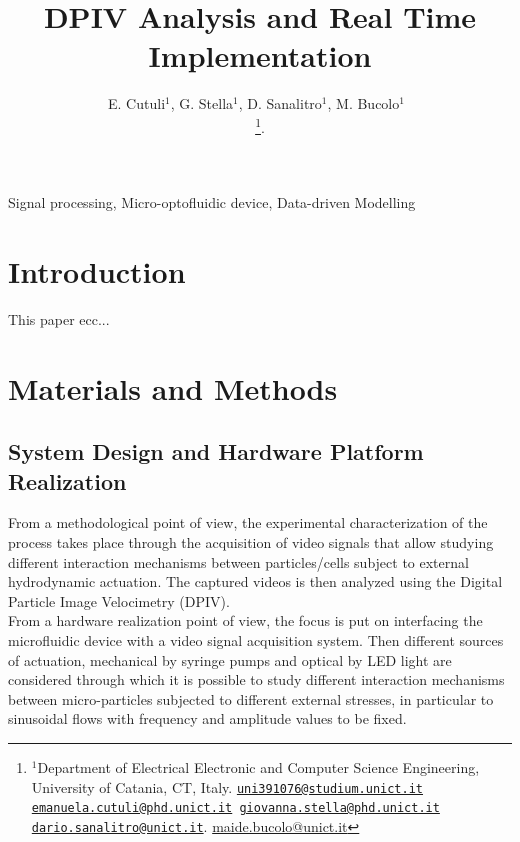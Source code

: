 \documentclass[journal]{IEEEtran}
\title{DPIV Analysis and Real Time Implementation}
\author{E. Cutuli${^{1}}$, G. Stella${^{1}}$, D. Sanalitro${^{1}}$, M. Bucolo${^{1}}$~\IEEEmembership{Senior Member,~IEEE}

\thanks{$^1$Department of Electrical Electronic and Computer Science Engineering, University of Catania, CT, Italy. {\tt \scriptsize\href{mailto:uni391076@studium.unict.it}{\mbox{uni391076@studium.unict.it}}
\scriptsize\href{mailto:emaunuela.cutuli@phd.unict.it}{\mbox{emanuela.cutuli@phd.unict.it}}
\scriptsize\href{mailto:giovanna.stella@phd.unict.it}{\mbox{giovanna.stella@phd.unict.it}}
\scriptsize\href{mailto:dario.sanalitro@unict.it}{\mbox{dario.sanalitro@unict.it}}}. 
\scriptsize\href{mailto:maide.bucolo@unict.it}{\mbox{maide.bucolo@unict.it}}}. 
}
\theoremstyle{definition}
\theoremstyle{remark}
\begin{document}


\maketitle

\begin{abstract}

\end{abstract}

\begin{IEEEkeywords}
	Signal processing, Micro-optofluidic device, Data-driven Modelling
\end{IEEEkeywords}

\section{Introduction}

This paper ecc...



\section{Materials and Methods}

\subsection{System Design and Hardware Platform Realization}\label{sec:design}

From a methodological point of view, the experimental characterization of the process takes place through the acquisition of video signals that allow studying different interaction mechanisms between particles/cells subject to external hydrodynamic actuation.
The captured videos is then analyzed using the Digital Particle Image Velocimetry (DPIV).
\\From a hardware realization point of view, the focus is put on interfacing the microfluidic device with a video signal acquisition system.
Then different sources of actuation, mechanical by syringe pumps and optical by LED light are considered through which it is possible to study different interaction mechanisms between micro-particles subjected to different external stresses, in particular to sinusoidal flows with frequency and amplitude values to be fixed. 
\end{document}
